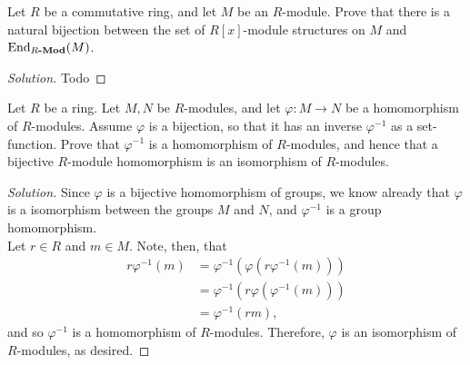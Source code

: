 \documentclass[12pt]{article}
\newenvironment{problem}[2][Problem]{\begin{trivlist}
\item[\hskip \labelsep {\bfseries #1}\hskip \labelsep {\bfseries #2.}]}{\end{trivlist}}
\newcommand{\catname}[1]{\normalfont\textbf{#1}}
\newcommand{\End}{\text{End}}
\newcommand{\Endmod}[2]{\End_{#1\catname{-Mod}}(#2)}
\newenvironment{solution}
  {\renewcommand\qedsymbol{$\blacksquare$}\begin{proof}[Solution]}
{\end{proof}}
\theoremstyle{remark}
\begin{document}
\begin{problem}{5.11}
  Let $R$ be a commutative ring, and let $M$ be an $R$-module.
  Prove that there is a natural bijection between the set of
  $R[x]$-module structures on $M$ and $\Endmod{R}{M}$.
\end{problem}
\begin{solution}
  Todo
\end{solution}

\begin{problem}{5.12}
  Let $R$ be a ring.
  Let $M,N$ be $R$-modules, and let $\varphi:M\to N$ be a homomorphism
  of $R$-modules.
  Assume $\varphi$ is a bijection, so that it has an inverse $\varphi^{-1}$
  as a set-function.
  Prove that $\varphi^{-1}$ is a homomorphism of $R$-modules, and hence
  that a bijective $R$-module homomorphism is an isomorphism of 
  $R$-modules.
\end{problem}
\begin{solution}
  Since $\varphi$ is a bijective homomorphism of groups, we know already
  that $\varphi$ is a isomorphism between the groups $M$ and $N$, 
  and $\varphi^{-1}$ is a group homomorphism. \\
  \indent Let $r\in R$ and $m\in M$.
  Note, then, that
  \begin{align*}
    r\varphi^{-1}(m) &= \varphi^{-1}(\varphi(r\varphi^{-1}(m))) \\
    &= \varphi^{-1}(r\varphi(\varphi^{-1}(m))) \\
    &= \varphi^{-1}(rm),
  \end{align*}
  and so $\varphi^{-1}$ is a homomorphism of $R$-modules.
  Therefore, $\varphi$ is an isomorphism of $R$-modules, as desired.
\end{solution}
\end{document}
